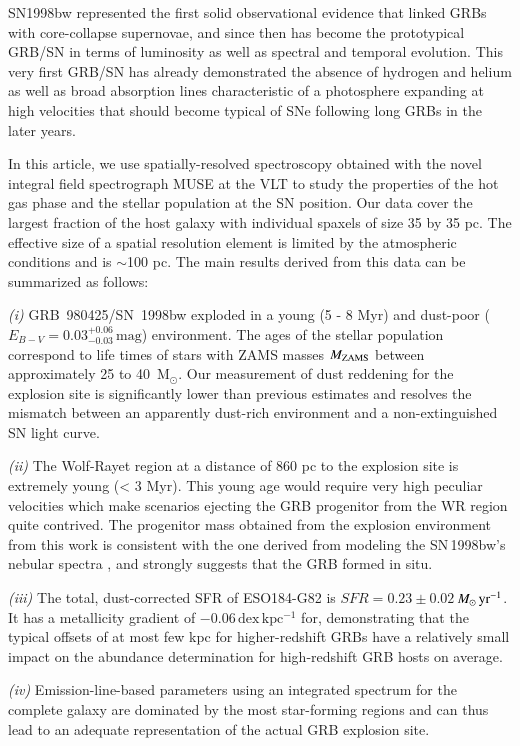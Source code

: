 \documentclass[traditabstract]{aa}
\newcommand{\Msunyr}{$M_\odot\,\rm{yr}^{-1}$}
\begin{document}
SN1998bw represented the first solid observational evidence that linked GRBs with core-collapse supernovae, and since then has become the prototypical GRB/SN in terms of luminosity as well as spectral and temporal evolution. This very first GRB/SN has already demonstrated the absence of hydrogen and helium as well as broad absorption lines characteristic of a photosphere expanding at high velocities that should become typical of SNe following long GRBs in the later years.

In this article, we use spatially-resolved spectroscopy obtained with the novel integral field spectrograph MUSE at the VLT to study the properties of the hot gas phase and the stellar population at the SN position. Our data cover the largest fraction of the host galaxy with individual spaxels of size 35 by 35 pc. The effective size of a spatial resolution element is limited by the atmospheric conditions and is $\sim$100 pc. The main results derived from this data can be summarized as follows:

\textit{(i)} GRB~980425/SN~1998bw exploded in a young (5 - 8 Myr) and dust-poor ($E_{B-V} = 0.03_{-0.03}^{+0.06}\,\mathrm{mag}$) environment. The ages of the stellar population correspond to life times of stars with ZAMS masses $M_{\rm{ZAMS}}$  between approximately 25 to 40~M$_{\odot}$. Our measurement of dust reddening for the explosion site is significantly lower than previous estimates and resolves the mismatch between an apparently dust-rich environment and a non-extinguished SN light curve.

\textit{(ii)} The Wolf-Rayet region at a distance of 860 pc to the explosion site is extremely young (< 3 Myr). This young age would require very high peculiar velocities which make scenarios ejecting the GRB progenitor from the WR region quite contrived. The progenitor mass obtained from the explosion environment from this work is consistent with the one derived from modeling the SN\,1998bw's nebular spectra \citep{2006ApJ...640..854M}, and strongly suggests that the GRB formed in situ.

\textit{(iii)} The total, dust-corrected SFR of ESO184-G82 is $SFR=0.23\pm0.02$\,\Msunyr. It has a metallicity gradient of $-0.06\,\mathrm{dex\,kpc^{-1}}$ for, demonstrating that the typical offsets of at most few kpc for higher-redshift GRBs have a relatively small impact on the abundance determination for high-redshift GRB hosts on average.

\textit{(iv)} Emission-line-based parameters using an integrated spectrum for the complete galaxy are dominated by the most star-forming regions and can thus lead to an adequate representation of the actual GRB explosion site.
\end{document}
